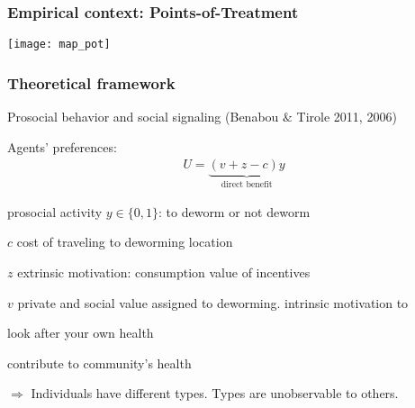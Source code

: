 \documentclass{beamer}
\theoremstyle{plain}
\begin{document}

\begin{frame}[label=slide6]
\frametitle{\large{Empirical context: Points-of-Treatment}}
\begin{center}
\texttt{[image: map\_pot]}
\end{center}
\end{frame}

\begin{frame}[label=slide7]
\frametitle{\large{Theoretical framework}}
\small{
Prosocial behavior and social signaling (Benabou $\&$ Tirole 2011, 2006)}
\smallskip
\small{
Agents' preferences:
\begin{align}
U = \underbrace{(v + z - c)y}_{\text{direct benefit}}  \nonumber
\end{align}
\begin{itemize}
\small{
\item prosocial activity $y \in \{0,1\}$: to deworm or not deworm
\item $c$ cost of traveling to deworming location 
\item $z$ extrinsic motivation: consumption value of incentives
\item $v$ private and social value assigned to deworming. intrinsic motivation to 
\begin{enumerate}
\small{
\item look after your own health 
\item contribute to community's health}
\end{enumerate}}
\end{itemize}
$\Rightarrow$ Individuals have different types. Types are unobservable to others.} 
\end{frame}
\end{document}
